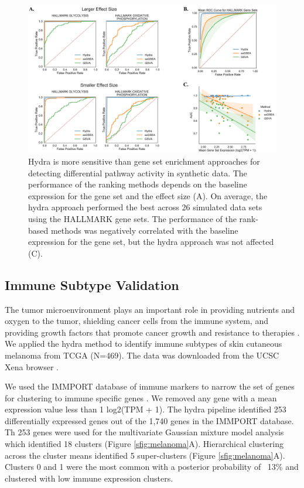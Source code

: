 \documentclass[fleqn,10pt]{wlscirep}
\begin{document}
\begin{figure}
	\centering
	\includegraphics[width=0.8\linewidth]{images/figure-2-roc-curves@2x.png}
	\caption{Hydra is more sensitive than gene set enrichment approaches for detecting differential pathway activity in synthetic data. The performance of the ranking methods depends on the baseline expression for the gene set and the effect size (A). On average, the hydra approach performed the best across 26 simulated data sets using the HALLMARK gene sets. The performance of the rank-based methods was negatively correlated with the baseline expression for the gene set, but the hydra approach was not affected (C).}
	\label{sfig:rocplot}
\end{figure}

\subsection*{Immune Subtype Validation}
The tumor microenvironment plays an important role in providing nutrients and oxygen to the tumor, shielding cancer cells from the immune system, and providing growth factors that promote cancer growth and resistance to therapies \cite{hanahan2012accessories}. We applied the hydra method to identify immune subtypes of skin cutaneous melanoma from TCGA (N=469). The data was downloaded from the UCSC Xena browser \cite{vivian2017toil}.

We used the IMMPORT database of immune markers to narrow the set of genes for clustering to immune specific genes \cite{bhattacharya2018immport}. We removed any gene with a mean expression value less than 1 log2(TPM + 1). The hydra pipeline identified 253 differentially expressed genes out of the 1,740 genes in the IMMPORT database. Th 253 genes were used for the multivariate Gaussian mixture model analysis which identified 18 clusters (Figure \ref{sfig:melanoma}A). Hierarchical clustering across the cluster means identified 5 super-clusters (Figure \ref{sfig:melanoma}A). Clusters 0 and 1 were the most common with a posterior probability of ~13\% and clustered with low immune expression clusters. 
\end{document}
